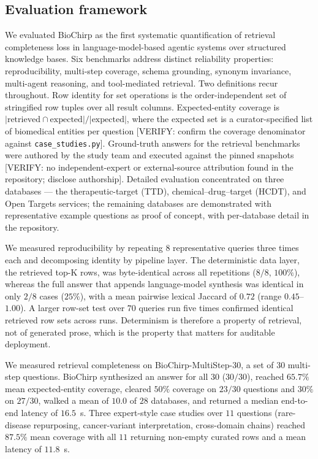 \subsection*{Evaluation framework}

We evaluated BioChirp as the first systematic quantification of retrieval completeness loss in language-model-based agentic systems over structured knowledge bases. Six benchmarks address distinct reliability properties: reproducibility, multi-step coverage, schema grounding, synonym invariance, multi-agent reasoning, and tool-mediated retrieval. Two definitions recur throughout. Row identity for set operations is the order-independent set of stringified row tuples over all result columns. Expected-entity coverage is $|\text{retrieved} \cap \text{expected}| / |\text{expected}|$, where the expected set is a curator-specified list of biomedical entities per question [VERIFY: confirm the coverage denominator against \texttt{case\_studies.py}]. Ground-truth answers for the retrieval benchmarks were authored by the study team and executed against the pinned snapshots [VERIFY: no independent-expert or external-source attribution found in the repository; disclose authorship]. Detailed evaluation concentrated on three databases — the therapeutic-target (TTD), chemical--drug--target (HCDT), and Open Targets services; the remaining databases are demonstrated with representative example questions as proof of concept, with per-database detail in the repository.

We measured reproducibility by repeating $8$ representative queries three times each and decomposing identity by pipeline layer. The deterministic data layer, the retrieved top-K rows, was byte-identical across all repetitions ($8/8$, $100\%$), whereas the full answer that appends language-model synthesis was identical in only $2/8$ cases ($25\%$), with a mean pairwise lexical Jaccard of $0.72$ (range $0.45$--$1.00$). A larger row-set test over $70$ queries run five times confirmed identical retrieved row sets across runs. Determinism is therefore a property of retrieval, not of generated prose, which is the property that matters for auditable deployment.

We measured retrieval completeness on BioChirp-MultiStep-30, a set of $30$ multi-step questions. BioChirp synthesized an answer for all $30$ ($30/30$), reached $65.7\%$ mean expected-entity coverage, cleared $50\%$ coverage on $23/30$ questions and $30\%$ on $27/30$, walked a mean of $10.0$ of $28$ databases, and returned a median end-to-end latency of $16.5$~s. Three expert-style case studies over $11$ questions (rare-disease repurposing, cancer-variant interpretation, cross-domain chains) reached $87.5\%$ mean coverage with all $11$ returning non-empty curated rows and a mean latency of $11.8$~s.

